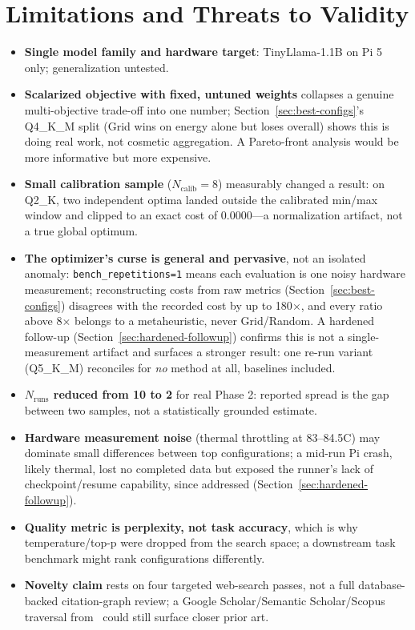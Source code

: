 \documentclass[conference, letterpaper]{IEEEtran}
\begin{document}
\section{Limitations and Threats to Validity}
\label{sec:limitations}

\begin{itemize}
  \item \textbf{Single model family and hardware target}: TinyLlama-1.1B on Pi 5 only; generalization untested.
  \item \textbf{Scalarized objective with fixed, untuned weights} collapses a genuine multi-objective trade-off into one number; Section~\ref{sec:best-configs}'s Q4\_K\_M split (Grid wins on energy alone but loses overall) shows this is doing real work, not cosmetic aggregation. A Pareto-front analysis would be more informative but more expensive.
  \item \textbf{Small calibration sample} ($N_{\text{calib}}=8$) measurably changed a result: on Q2\_K, two independent optima landed outside the calibrated min/max window and clipped to an exact cost of 0.0000---a normalization artifact, not a true global optimum.
  \item \textbf{The optimizer's curse is general and pervasive}, not an isolated anomaly: \texttt{bench\_repetitions=1} means each evaluation is one noisy hardware measurement; reconstructing costs from raw metrics (Section~\ref{sec:best-configs}) disagrees with the recorded cost by up to 180$\times$, and every ratio above 8$\times$ belongs to a metaheuristic, never Grid/Random. A hardened follow-up (Section~\ref{sec:hardened-followup}) confirms this is not a single-measurement artifact and surfaces a stronger result: one re-run variant (Q5\_K\_M) reconciles for \emph{no} method at all, baselines included.
  \item \textbf{$N_{\text{runs}}$ reduced from 10 to 2} for real Phase 2: reported spread is the gap between two samples, not a statistically grounded estimate.
  \item \textbf{Hardware measurement noise} (thermal throttling at 83--84.5\textdegree C) may dominate small differences between top configurations; a mid-run Pi crash, likely thermal, lost no completed data but exposed the runner's lack of checkpoint/resume capability, since addressed (Section~\ref{sec:hardened-followup}).
  \item \textbf{Quality metric is perplexity, not task accuracy}, which is why temperature/top-p were dropped from the search space; a downstream task benchmark might rank configurations differently.
  \item \textbf{Novelty claim} rests on four targeted web-search passes, not a full database-backed citation-graph review; a Google Scholar/Semantic Scholar/Scopus traversal from~\cite{ref19,ref20,ref21,ref22} could still surface closer prior art.
\end{itemize}
\end{document}
